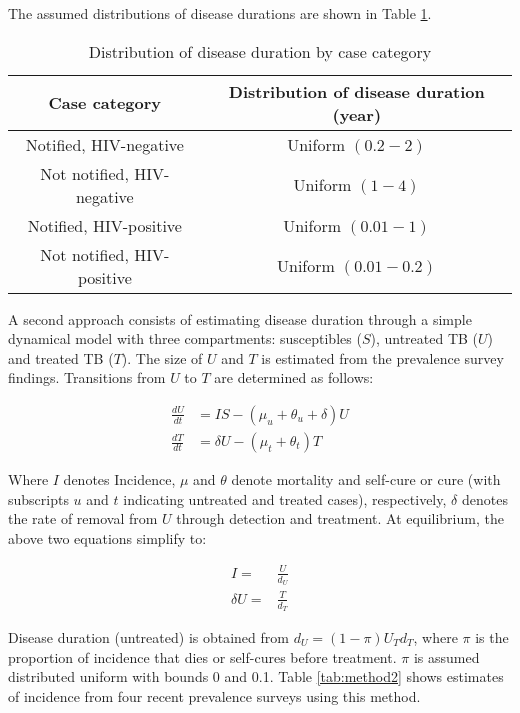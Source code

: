 The assumed distributions of disease durations are shown in Table \ref{tab:duration}.

\begin{table} 
    \label{tab:duration}
    \begin{tabular}{ c c }
        \hline
        Case category & Distribution of disease duration (year) \\ 
        \hline
        Notified, HIV-negative & Uniform $(0.2 - 2)$ \\ 
        Not notified, HIV-negative & Uniform $(1 - 4)$ \\ 
        Notified, HIV-positive & Uniform $(0.01 - 1)$ \\ 
        Not notified, HIV-positive & Uniform $(0.01 - 0.2)$ \\ 
        \hline
    \end{tabular} 
    \caption{Distribution of disease duration by case category} 
\end{table}



A second approach consists of estimating disease duration through a simple dynamical model with three compartments: susceptibles ($S$), untreated TB ($U$) and treated TB ($T$). The size of $U$ and $T$ is estimated from the prevalence survey findings. Transitions from $U$ to $T$ are determined as follows:

\begin{align*}
\frac{dU}{dt} &= I S - (\mu_u + \theta_u + \delta)U \\
\frac{dT}{dt} &= \delta U - (\mu_t + \theta_t) T
\end{align*}

Where $I$ denotes Incidence, $\mu$ and $\theta$ denote mortality and self-cure or cure (with subscripts $u$ and $t$ indicating untreated and treated cases), respectively, $\delta$ denotes the rate of removal from $U$ through detection and treatment. At equilibrium, the above two equations simplify to: 

\begin{align*}
I = &\frac{U}{d_U} \\
\delta U = &\frac{T}{d_T}
\end{align*}

Disease duration (untreated) is obtained from $d_U=(1-\pi)U_T d_T$, where $\pi$ is the proportion of incidence that dies or self-cures before treatment. $\pi$ is assumed distributed uniform with bounds 0 and 0.1. Table \ref{tab:method2} shows estimates of incidence from four recent prevalence surveys using this method. 


